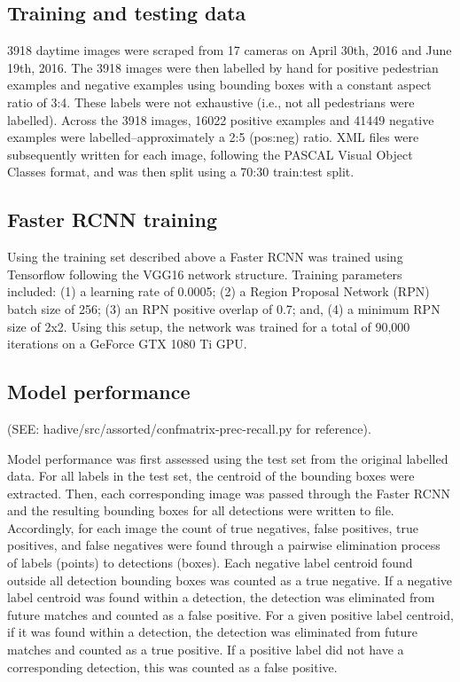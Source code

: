 \documentclass[10pt,letterpaper]{article}
\begin{document}
\subsection*{Training and testing data}
3918 daytime images were scraped from 17 cameras on April 30th, 2016 and June 19th, 2016. The 3918 images were then labelled by hand for positive pedestrian examples and negative examples using bounding boxes with a constant aspect ratio of 3:4. These labels were not exhaustive (i.e., not all pedestrians were labelled). Across the 3918 images, 16022 positive examples and 41449 negative examples were labelled--approximately a 2:5 (pos:neg) ratio. XML files were subsequently written for each image, following the PASCAL Visual Object Classes format, and was then split using a 70:30 train:test split.

\subsection*{Faster RCNN training}
Using the training set described above a Faster RCNN was trained using Tensorflow following the VGG16 network structure. Training parameters included: (1) a learning rate of 0.0005; (2) a Region Proposal Network (RPN) batch size of 256; (3) an RPN positive overlap of 0.7; and, (4) a minimum RPN size of 2x2. Using this setup, the network was trained for a total of 90,000 iterations on a GeForce GTX 1080 Ti GPU.

\subsection*{Model performance}
(SEE: hadive/src/assorted/confmatrix-prec-recall.py for reference).

Model performance was first assessed using the test set from the original labelled data. For all labels in the test set, the centroid of the bounding boxes were extracted. Then, each corresponding image was passed through the Faster RCNN and the resulting bounding boxes for all detections were written to file. Accordingly, for each image the count of true negatives, false positives, true positives, and false negatives were found through a pairwise elimination process of labels (points) to detections (boxes). Each negative label centroid found outside all detection bounding boxes was counted as a true negative. If a negative label centroid was found within a detection, the detection was eliminated from future matches and counted as a false positive. For a given positive label centroid, if it was found within a detection, the detection was eliminated from future matches and counted as a true positive. If a positive label did not have a corresponding detection, this was counted as a false positive.
\end{document}
